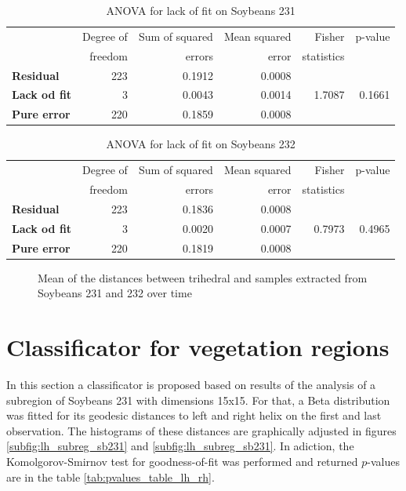 \documentclass[12pt]{article}
\begin{document}
\begin{table}[hbt]
  \centering
  \caption{ANOVA for lack of fit on Soybeans 231}
  \label{tab:anova_sb231}
  \begin{tabular}{lrrrrr}
    \toprule
    & Degree of & Sum of squared & Mean squared & Fisher & p-value\\
    & freedom & errors & error & statistics &\\
    \cmidrule(lr){2-6}
    \textbf{Residual} & 223 & 0.1912 & 0.0008 & &\\
    \textbf{Lack od fit} & 3 & 0.0043 & 0.0014 & 1.7087 & 0.1661\\
    \textbf{Pure error} & 220 & 0.1859 & 0.0008 & &\\
    \bottomrule
  \end{tabular}
\end{table}

\begin{table}[hbt]
  \centering
  \caption{ANOVA for lack of fit on Soybeans 232}
  \label{tab:anova_sb232}
  \begin{tabular}{lrrrrr}
    \toprule
    & Degree of & Sum of squared & Mean squared & Fisher & p-value\\
    & freedom & errors & error & statistics &\\
    \cmidrule(lr){2-6}
    \textbf{Residual} & 223 & 0.1836 & 0.0008 & &\\
    \textbf{Lack od fit} & 3 & 0.0020 & 0.0007 & 0.7973 & 0.4965\\
    \textbf{Pure error} & 220 & 0.1819 & 0.0008 & &\\
    \bottomrule
  \end{tabular}
\end{table}

\begin{figure}[!h]
  \caption{Mean of the distances between trihedral and samples extracted from Soybeans 231 and 232 over time}
  \label{fig:tri_mean_sb_231_232}
\end{figure}

\section{Classificator for vegetation regions}
In this section a classificator is proposed based on results of the analysis of a subregion of Soybeans 231 with dimensions 15x15. For that, a Beta distribution was fitted for its geodesic distances to left and right helix on the first and last observation. The histograms of these distances are graphically adjusted in figures \ref{subfig:lh_subreg_sb231} and \ref{subfig:lh_subreg_sb231}. In adiction, the Komolgorov-Smirnov test for goodness-of-fit was performed and returned $p$-values are in the table \ref{tab:pvalues_table_lh_rh}.
\end{document}
